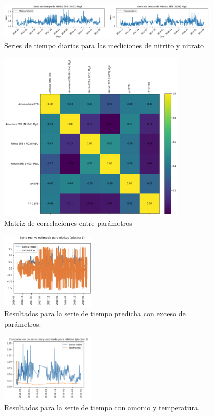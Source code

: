 \documentclass[letterpaper, 12pt]{article}
\begin{document}
\begin{figure}
  \centering
    \includegraphics[width=0.95\textwidth]{img/timeseries2.png}
  \caption{Series de tiempo diarias para las mediciones de nitrito y nitrato}
  \label{fig:timeseries2}
\end{figure}

\begin{figure}
  \centering
    \includegraphics[width=0.8\textwidth]{img/corrmatrix1.png}
  \caption{Matriz de correlaciones entre parámetros}
  \label{fig:corrmatrix1}
\end{figure}


\begin{figure}
  \centering
    \includegraphics[width=0.4\textwidth]{img/res_malo.png}
  \caption{Resultados para la serie de tiempo predicha con exceso de parámetros.}
  \label{fig:res_malo}
\end{figure}

\begin{figure}
  \centering
    \includegraphics[width=0.4\textwidth]{img/amonio-temp.png}
  \caption{Resultados para la serie de tiempo con amonio y temperatura.}
  \label{fig:results-amonio}
\end{figure}

%
\end{document}
